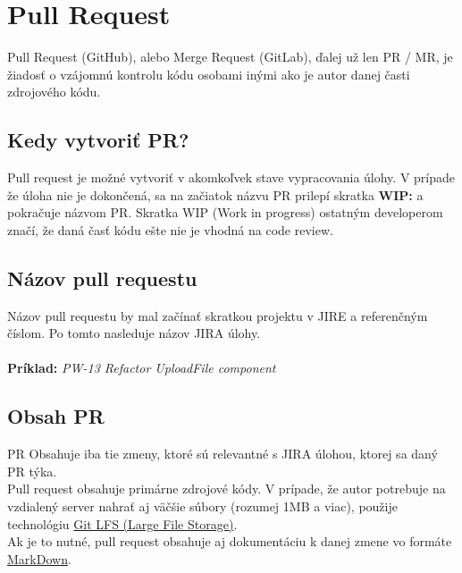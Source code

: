 \documentclass{article}
\begin{document}
    

    \section*{Pull Request}

    Pull Request (GitHub), alebo Merge Request (GitLab), ďalej už len PR / MR, je žiadosť o vzájomnú kontrolu
    kódu osobami inými ako je autor danej časti zdrojového kódu.

    \subsection*{Kedy vytvoriť PR?}

    Pull request je možné vytvoriť v akomkoľvek stave vypracovania úlohy. V prípade že úloha nie je dokončená, sa na začiatok
    názvu PR prilepí skratka \textbf{WIP:} a pokračuje názvom PR.
    Skratka WIP (Work in progress) ostatným developerom značí, že daná časť kódu ešte nie je vhodná na code review.

    \subsection*{Názov pull requestu}

    Názov pull requestu by mal začínať skratkou projektu v JIRE a referenčným číslom. Po tomto nasleduje názov JIRA úlohy.\\\\
    \textbf{Príklad:} \emph{PW-13 Refactor UploadFile component}

    \subsection*{Obsah PR}

    PR Obsahuje iba tie zmeny, ktoré sú relevantné s JIRA úlohou, ktorej sa daný PR týka.\\

    \noindent Pull request obsahuje primárne zdrojové kódy. V prípade, že autor potrebuje na vzdialený server nahrať aj väčšie
    súbory (rozumej 1MB a viac), použije technológiu \href{https://git-lfs.github.com/}{Git LFS (Large File Storage)}.\\

    \noindent Ak je to nutné, pull request obsahuje aj dokumentáciu k danej zmene vo formáte \href{https://www.markdownguide.org/}{MarkDown}.\\
\end{document}
